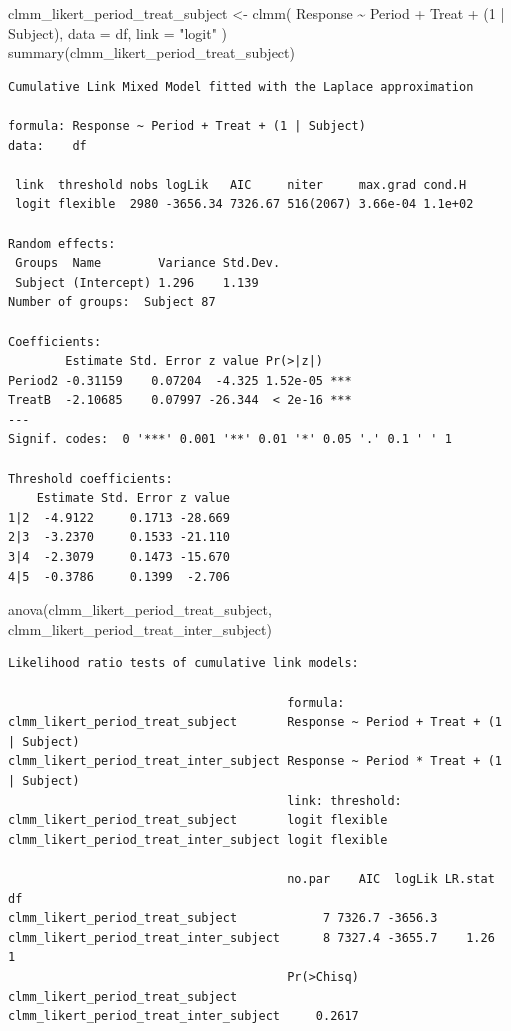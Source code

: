\documentclass[
  letterpaper,
  DIV=11,
  numbers=noendperiod]{scrartcl}
\newenvironment{Shaded}{\begin{snugshade}}{\end{snugshade}}
\newcommand{\AttributeTok}[1]{\textcolor[rgb]{0.40,0.45,0.13}{#1}}
\newcommand{\DecValTok}[1]{\textcolor[rgb]{0.68,0.00,0.00}{#1}}
\newcommand{\FunctionTok}[1]{\textcolor[rgb]{0.28,0.35,0.67}{#1}}
\newcommand{\NormalTok}[1]{\textcolor[rgb]{0.00,0.23,0.31}{#1}}
\newcommand{\OtherTok}[1]{\textcolor[rgb]{0.00,0.23,0.31}{#1}}
\newcommand{\SpecialCharTok}[1]{\textcolor[rgb]{0.37,0.37,0.37}{#1}}
\newcommand{\StringTok}[1]{\textcolor[rgb]{0.13,0.47,0.30}{#1}}
\begin{document}
\begin{Shaded}
\begin{Highlighting}[]
\NormalTok{clmm\_likert\_period\_treat\_subject }\OtherTok{\textless{}{-}}
    \FunctionTok{clmm}\NormalTok{(}
\NormalTok{        Response }\SpecialCharTok{\textasciitilde{}}\NormalTok{ Period }\SpecialCharTok{+}\NormalTok{ Treat }\SpecialCharTok{+}\NormalTok{ (}\DecValTok{1} \SpecialCharTok{|}\NormalTok{ Subject),}
        \AttributeTok{data =}\NormalTok{ df, }\AttributeTok{link =} \StringTok{"logit"}
\NormalTok{    )}
\FunctionTok{summary}\NormalTok{(clmm\_likert\_period\_treat\_subject)}
\end{Highlighting}
\end{Shaded}

\begin{verbatim}
Cumulative Link Mixed Model fitted with the Laplace approximation

formula: Response ~ Period + Treat + (1 | Subject)
data:    df

 link  threshold nobs logLik   AIC     niter     max.grad cond.H 
 logit flexible  2980 -3656.34 7326.67 516(2067) 3.66e-04 1.1e+02

Random effects:
 Groups  Name        Variance Std.Dev.
 Subject (Intercept) 1.296    1.139   
Number of groups:  Subject 87 

Coefficients:
        Estimate Std. Error z value Pr(>|z|)    
Period2 -0.31159    0.07204  -4.325 1.52e-05 ***
TreatB  -2.10685    0.07997 -26.344  < 2e-16 ***
---
Signif. codes:  0 '***' 0.001 '**' 0.01 '*' 0.05 '.' 0.1 ' ' 1

Threshold coefficients:
    Estimate Std. Error z value
1|2  -4.9122     0.1713 -28.669
2|3  -3.2370     0.1533 -21.110
3|4  -2.3079     0.1473 -15.670
4|5  -0.3786     0.1399  -2.706
\end{verbatim}

\begin{Shaded}
\begin{Highlighting}[]
\FunctionTok{anova}\NormalTok{(clmm\_likert\_period\_treat\_subject, clmm\_likert\_period\_treat\_inter\_subject)}
\end{Highlighting}
\end{Shaded}

\begin{verbatim}
Likelihood ratio tests of cumulative link models:
 
                                       formula:                                 
clmm_likert_period_treat_subject       Response ~ Period + Treat + (1 | Subject)
clmm_likert_period_treat_inter_subject Response ~ Period * Treat + (1 | Subject)
                                       link: threshold:
clmm_likert_period_treat_subject       logit flexible  
clmm_likert_period_treat_inter_subject logit flexible  

                                       no.par    AIC  logLik LR.stat df
clmm_likert_period_treat_subject            7 7326.7 -3656.3           
clmm_likert_period_treat_inter_subject      8 7327.4 -3655.7    1.26  1
                                       Pr(>Chisq)
clmm_likert_period_treat_subject                 
clmm_likert_period_treat_inter_subject     0.2617
\end{verbatim}
\end{document}
